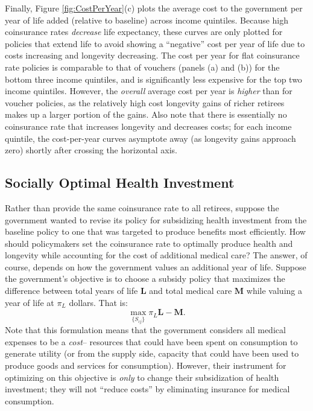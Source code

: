 \documentclass[12pt,pdftex,letterpaper]{article}
\newcommand{\Type}{\iota}
\newcommand{\Subsidy}{S}
\newcommand{\Age}{j}
\begin{document}
Finally, Figure \ref{fig:CostPerYear}(c) plots the average cost to the government per year of life added (relative to baseline) across income quintiles.  Because high coinsurance rates \textit{decrease} life expectancy, these curves are only plotted for policies that extend life to avoid showing a ``negative'' cost per year of life due to costs increasing and longevity decreasing.  The cost per year for flat coinsurance rate policies is comparable to that of vouchers (panels (a) and (b)) for the bottom three income quintiles, and is significantly less expensive for the top two income quintiles.  However, the \textit{overall} average cost per year is \textit{higher} than for voucher policies, as the relatively high cost longevity gains of richer retirees makes up a larger portion of the gains.  Also note that there is essentially no coinsurance rate that increases longevity and decreases costs; for each income quintile, the cost-per-year curves asymptote away (as longevity gains approach zero) shortly after crossing the horizontal axis.


\subsection{Socially Optimal Health Investment}
\label{sec:SocOpt}

Rather than provide the same coinsurance rate to all retirees, suppose the government wanted to revise its policy for subsidizing health investment from the baseline policy to one that was targeted to produce benefits most efficiently.  How should policymakers set the coinsurance rate to optimally produce health and longevity while accounting for the cost of additional medical care?  The answer, of course, depends on how the government values an additional year of life.  Suppose the government's objective is to choose a subsidy policy that maximizes the difference between total years of life $\textbf{L}$ and total medical care $\textbf{M}$ while valuing a year of life at $\pi_L$ dollars.  That is:
\begin{equation}\label{GovtProblem}
\max_{\{\Subsidy_{\Type \Age} \}} \pi_L \textbf{L} - \textbf{M}.
\end{equation}
Note that this formulation means that the government considers all medical expenses to be a \textit{cost}-- resources that could have been spent on consumption to generate utility (or from the supply side, capacity that could have been used to produce goods and services for consumption).  However, their instrument for optimizing on this objective is \textit{only} to change their subsidization of health investment; they will not ``reduce costs'' by eliminating insurance for medical consumption.
\end{document}
